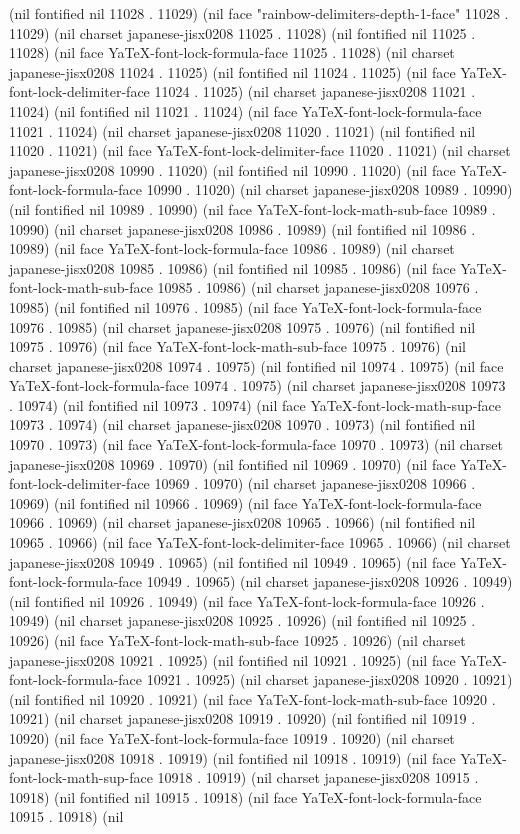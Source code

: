 (nil fontified nil 11028 . 11029) (nil face "rainbow-delimiters-depth-1-face" 11028 . 11029) (nil charset japanese-jisx0208 11025 . 11028) (nil fontified nil 11025 . 11028) (nil face YaTeX-font-lock-formula-face 11025 . 11028) (nil charset japanese-jisx0208 11024 . 11025) (nil fontified nil 11024 . 11025) (nil face YaTeX-font-lock-delimiter-face 11024 . 11025) (nil charset japanese-jisx0208 11021 . 11024) (nil fontified nil 11021 . 11024) (nil face YaTeX-font-lock-formula-face 11021 . 11024) (nil charset japanese-jisx0208 11020 . 11021) (nil fontified nil 11020 . 11021) (nil face YaTeX-font-lock-delimiter-face 11020 . 11021) (nil charset japanese-jisx0208 10990 . 11020) (nil fontified nil 10990 . 11020) (nil face YaTeX-font-lock-formula-face 10990 . 11020) (nil charset japanese-jisx0208 10989 . 10990) (nil fontified nil 10989 . 10990) (nil face YaTeX-font-lock-math-sub-face 10989 . 10990) (nil charset japanese-jisx0208 10986 . 10989) (nil fontified nil 10986 . 10989) (nil face YaTeX-font-lock-formula-face 10986 . 10989) (nil charset japanese-jisx0208 10985 . 10986) (nil fontified nil 10985 . 10986) (nil face YaTeX-font-lock-math-sub-face 10985 . 10986) (nil charset japanese-jisx0208 10976 . 10985) (nil fontified nil 10976 . 10985) (nil face YaTeX-font-lock-formula-face 10976 . 10985) (nil charset japanese-jisx0208 10975 . 10976) (nil fontified nil 10975 . 10976) (nil face YaTeX-font-lock-math-sub-face 10975 . 10976) (nil charset japanese-jisx0208 10974 . 10975) (nil fontified nil 10974 . 10975) (nil face YaTeX-font-lock-formula-face 10974 . 10975) (nil charset japanese-jisx0208 10973 . 10974) (nil fontified nil 10973 . 10974) (nil face YaTeX-font-lock-math-sup-face 10973 . 10974) (nil charset japanese-jisx0208 10970 . 10973) (nil fontified nil 10970 . 10973) (nil face YaTeX-font-lock-formula-face 10970 . 10973) (nil charset japanese-jisx0208 10969 . 10970) (nil fontified nil 10969 . 10970) (nil face YaTeX-font-lock-delimiter-face 10969 . 10970) (nil charset japanese-jisx0208 10966 . 10969) (nil fontified nil 10966 . 10969) (nil face YaTeX-font-lock-formula-face 10966 . 10969) (nil charset japanese-jisx0208 10965 . 10966) (nil fontified nil 10965 . 10966) (nil face YaTeX-font-lock-delimiter-face 10965 . 10966) (nil charset japanese-jisx0208 10949 . 10965) (nil fontified nil 10949 . 10965) (nil face YaTeX-font-lock-formula-face 10949 . 10965) (nil charset japanese-jisx0208 10926 . 10949) (nil fontified nil 10926 . 10949) (nil face YaTeX-font-lock-formula-face 10926 . 10949) (nil charset japanese-jisx0208 10925 . 10926) (nil fontified nil 10925 . 10926) (nil face YaTeX-font-lock-math-sub-face 10925 . 10926) (nil charset japanese-jisx0208 10921 . 10925) (nil fontified nil 10921 . 10925) (nil face YaTeX-font-lock-formula-face 10921 . 10925) (nil charset japanese-jisx0208 10920 . 10921) (nil fontified nil 10920 . 10921) (nil face YaTeX-font-lock-math-sub-face 10920 . 10921) (nil charset japanese-jisx0208 10919 . 10920) (nil fontified nil 10919 . 10920) (nil face YaTeX-font-lock-formula-face 10919 . 10920) (nil charset japanese-jisx0208 10918 . 10919) (nil fontified nil 10918 . 10919) (nil face YaTeX-font-lock-math-sup-face 10918 . 10919) (nil charset japanese-jisx0208 10915 . 10918) (nil fontified nil 10915 . 10918) (nil face YaTeX-font-lock-formula-face 10915 . 10918) (nil 